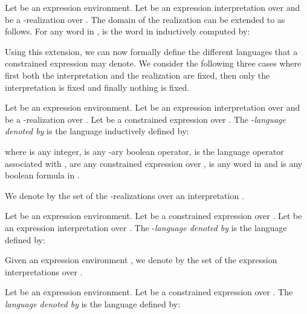 \documentclass[a4paper]{llncs}
\begin{document}
    Let  be an expression environment. Let  be an expression interpretation over  and  be a -realization over . The domain of the realization  can be extended to  as follows. For any word  in ,  is the word in  inductively computed by:
      
    
  Using this extension, we can now formally define the different languages that a constrained expression may denote. We consider the following three cases where first both the interpretation and
the realization are fixed, then only the interpretation is fixed
and finally nothing is fixed.
  
  \begin{definition}[(I,r)-Language]\label{def i r lang}
    Let  be an expression environment. Let  be an expression interpretation over  and  be a -realization over . Let  be a constrained expression over .
    The -\emph{language denoted by}  is the language  inductively defined by:
    
    where  is any integer,  is any -ary boolean operator,  is the language operator associated with ,  are any  constrained expression over ,  is any word in  and  is any boolean formula in .
  \end{definition}
  
  We denote by  the set of the -realizations over an interpretation .
    
  \begin{definition}[I-Language]
    Let  be an expression environment. Let  be a constrained expression over . Let  be an expression interpretation over . The -\emph{language denoted by}  is the language  defined by:
    
  \end{definition}
  
  Given an expression environment , we denote by  the set of the expression interpretations over .
    
  \begin{definition}[Language]
    Let  be an expression environment. Let  be a constrained expression over . The \emph{language denoted by}  is the language  defined by:
    
  \end{definition}
  
\end{document}
